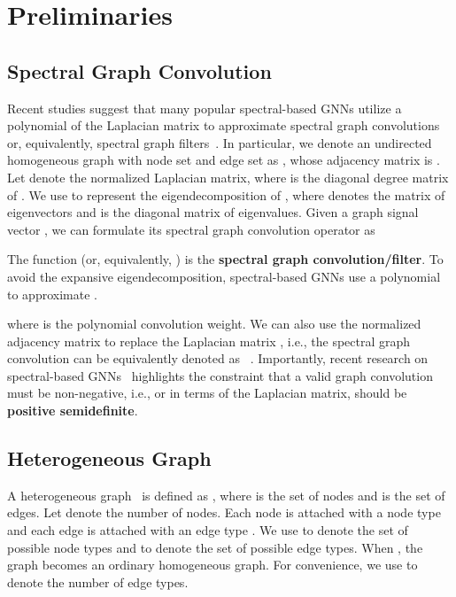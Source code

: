 \documentclass{article}
\begin{document}
\section{Preliminaries}
\subsection{Spectral Graph Convolution}\label{se:spectral_g_conv}
Recent studies suggest that many popular spectral-based GNNs utilize a polynomial of the Laplacian matrix to approximate spectral graph convolutions or, equivalently, spectral graph filters~\cite{gcn,Chebnet,bernnet,jacobi,chebnetii}. In particular,
we denote an undirected homogeneous graph with node set  and edge set  as , whose adjacency matrix is  . Let  denote the normalized Laplacian matrix, where  is the diagonal degree matrix of . We use  to represent the eigendecomposition of , where  denotes the matrix of eigenvectors and  is the diagonal matrix of eigenvalues. Given a graph signal vector , we can formulate its spectral graph convolution operator as

The function  (or, equivalently, ) is the \textbf{ spectral graph convolution/filter}. To avoid the expansive eigendecomposition, spectral-based GNNs use a polynomial to approximate .

where  is the polynomial convolution weight. We can also use the normalized adjacency matrix  to replace the Laplacian matrix , i.e., the spectral graph convolution can be equivalently denoted as ~\cite{gprgnn,bernnet}. Importantly, recent research on spectral-based GNNs~\cite{bernnet} highlights the constraint that a valid graph convolution  must be non-negative, i.e.,  or in terms of the Laplacian matrix,  should be \textbf{positive semidefinite}. 









\subsection{Heterogeneous Graph}
A heterogeneous graph~\cite{hetero_graph} is defined as , where  is the set of nodes and  is the set of edges. Let  denote the number of nodes.
Each node  is attached with a node type  and each edge  is attached with an edge type . We use  to denote the set of possible node types and  to denote the set of possible edge types. When , the graph becomes an ordinary homogeneous graph. For  convenience, we use  to denote the number of edge types.
\end{document}
